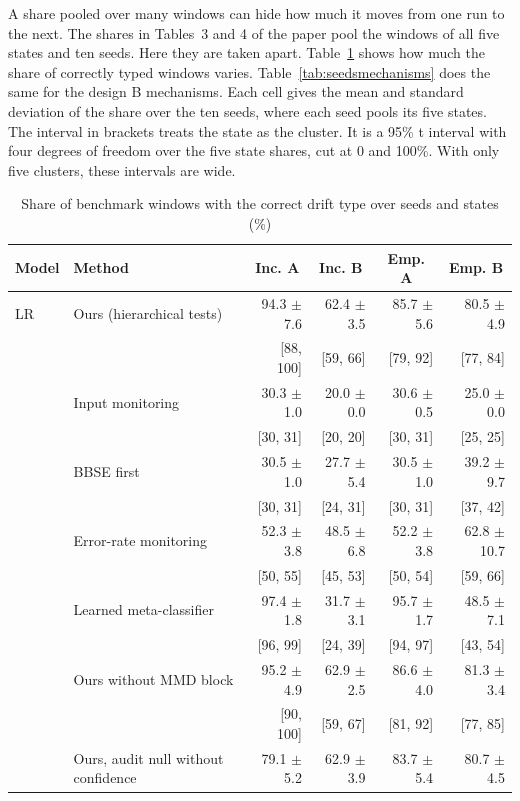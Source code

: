\documentclass[pdflatex,sn-basic]{sn-jnl}
\begin{document}
A share pooled over many windows can hide how much it moves from one run to the next. The shares in Tables~3 and 4 of the paper pool the windows of all five states and ten seeds. Here they are taken apart. Table~\ref{tab:seedsmethods} shows how much the share of correctly typed windows varies. Table~\ref{tab:seedsmechanisms} does the same for the design B mechanisms. Each cell gives the mean and standard deviation of the share over the ten seeds, where each seed pools its five states. The interval in brackets treats the state as the cluster. It is a 95\% t interval with four degrees of freedom over the five state shares, cut at 0 and 100\%. With only five clusters, these intervals are wide.

\begin{table}[!htbp]\centering\tablebodyfont
\caption{Share of benchmark windows with the correct drift type over seeds and states (\%)}\label{tab:seedsmethods}%
\begin{tabular}{@{}llrrrr@{}}
\toprule
Model & Method & \multicolumn{1}{c}{Inc. A} & \multicolumn{1}{c}{Inc. B} & \multicolumn{1}{c}{Emp. A} & \multicolumn{1}{c}{Emp. B} \\
\midrule
LR & Ours (hierarchical tests) & 94.3 $\pm$ 7.6 & 62.4 $\pm$ 3.5 & 85.7 $\pm$ 5.6 & 80.5 $\pm$ 4.9 \\
 &  & [88, 100] & [59, 66] & [79, 92] & [77, 84] \\
 & Input monitoring & 30.3 $\pm$ 1.0 & 20.0 $\pm$ 0.0 & 30.6 $\pm$ 0.5 & 25.0 $\pm$ 0.0 \\
 &  & [30, 31] & [20, 20] & [30, 31] & [25, 25] \\
 & BBSE first & 30.5 $\pm$ 1.0 & 27.7 $\pm$ 5.4 & 30.5 $\pm$ 1.0 & 39.2 $\pm$ 9.7 \\
 &  & [30, 31] & [24, 31] & [30, 31] & [37, 42] \\
 & Error-rate monitoring & 52.3 $\pm$ 3.8 & 48.5 $\pm$ 6.8 & 52.2 $\pm$ 3.8 & 62.8 $\pm$ 10.7 \\
 &  & [50, 55] & [45, 53] & [50, 54] & [59, 66] \\
 & Learned meta-classifier & 97.4 $\pm$ 1.8 & 31.7 $\pm$ 3.1 & 95.7 $\pm$ 1.7 & 48.5 $\pm$ 7.1 \\
 &  & [96, 99] & [24, 39] & [94, 97] & [43, 54] \\
 & Ours without MMD block & 95.2 $\pm$ 4.9 & 62.9 $\pm$ 2.5 & 86.6 $\pm$ 4.0 & 81.3 $\pm$ 3.4 \\
 &  & [90, 100] & [59, 67] & [81, 92] & [77, 85] \\
 & Ours, audit null without confidence & 79.1 $\pm$ 5.2 & 62.9 $\pm$ 3.9 & 83.7 $\pm$ 5.4 & 80.7 $\pm$ 4.5 \\

\end{tabular}
\end{table}
\end{document}
